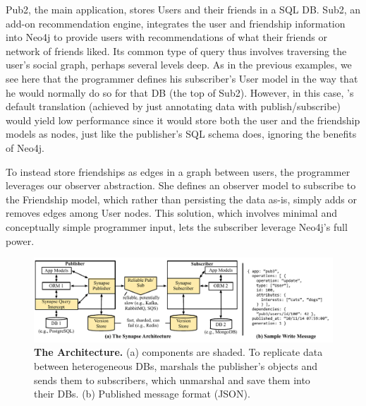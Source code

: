Pub2, the main application, stores Users and their friends in a SQL DB.
Sub2, an add-on recommendation engine, integrates the user and friendship
information into Neo4j to provide users with recommendations of what their
friends or network of friends liked. Its common type of query thus involves
traversing the user's social graph, perhaps several levels deep.  As in the
previous examples, we see here that the programmer defines his subscriber's User
model in the way that he would normally do so for that DB (the top of
Sub2).  However, in this case, \synapse's default translation (achieved by just
annotating data with publish/subscribe) would yield low performance since it
would store both the user and the friendship models as nodes, just like the
publisher's SQL schema does, ignoring the benefits of Neo4j.

To instead store friendships as edges in a graph between users, the programmer
leverages our observer abstraction.  She defines an observer model to
subscribe to the Friendship model, which rather than persisting the data as-is,
simply adds or removes edges among User nodes.  This solution, which involves
minimal and conceptually simple programmer input, lets the subscriber
leverage Neo4j's full power.

\begin{figure}[t+]
 \centering \includegraphics[width=.9\linewidth]{figures/synapse/architecture-less-detail.pdf} \vspace{-12pt}
 \caption{\small {{\bf The \synapse Architecture.}
   (a) \synapse components are shaded.  To replicate data between
       heterogeneous DBs, \synapse marshals the publisher's objects and
       sends them to subscribers, which unmarshal and save them into their
       DBs.  (b) Published message format (JSON).}}
 \label{synapse:fig:architecture}
 \vspace{-15pt}
\end{figure}

